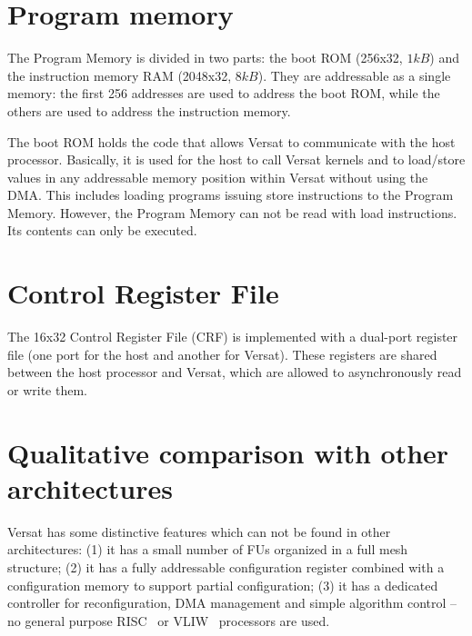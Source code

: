 \section{Program memory}
\label{section:programMemory}

The Program Memory is divided in two parts: the boot ROM (256x32,
$1kB$) and the instruction memory RAM (2048x32, $8kB$). They are
addressable as a single memory: the first 256 addresses are used to
address the boot ROM, while the others are used to address the
instruction memory.

The boot ROM holds the code that allows Versat to communicate with the
host processor. Basically, it is used for the host to call Versat
kernels and to load/store values in any addressable memory position
within Versat without using the DMA. This includes loading programs
issuing store instructions to the Program Memory. However, the Program
Memory can not be read with load instructions. Its contents can only
be executed.


\section{Control Register File}
\label{section:controlRegisterFile}

The 16x32 Control Register File (CRF) is implemented with a dual-port
register file (one port for the host and another for Versat). These
registers are shared between the host processor and Versat, which are
allowed to asynchronously read or write them.

\section{Qualitative comparison with other architectures}
\label{section:archComparisonWOtherArchitectures}

Versat has some distinctive features which can not be found in other
architectures: (1) it has a small number of FUs organized in a full
mesh structure; (2) it has a fully addressable configuration register
combined with a configuration memory to support partial configuration;
(3) it has a dedicated controller for reconfiguration, DMA management
and simple algorithm control -- no general purpose RISC~\cite{Lee00}
or VLIW~\cite{Mei05} processors are used.


